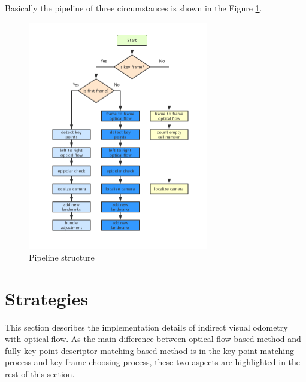 \documentclass{easychair}
\begin{document}
Basically the pipeline of three circumstances is shown in the Figure \ref{fig:pipeline structure}.

\begin{figure}[h!]
	\centering
	\includegraphics[width=0.7\textwidth]{img/flowchart.png}
	\caption{Pipeline structure}
	\label{fig:pipeline structure}
\end{figure}



\section{Strategies}
This section describes the implementation details of indirect visual odometry with optical flow. As the main difference between optical flow based method and fully key point descriptor matching based method is in the key point matching process and key frame choosing process, these two aspects are highlighted in the rest of this section.

\end{document}
